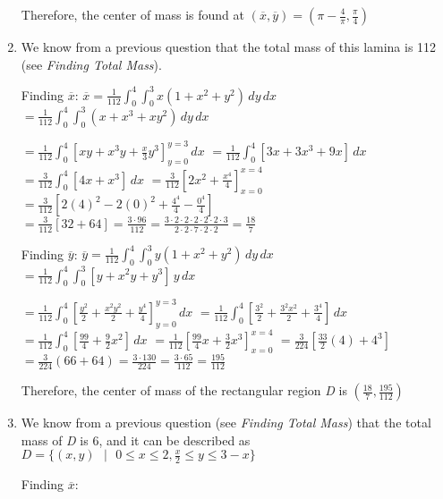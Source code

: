 \begin{Answer}[ref = c_of_m]
\begin{enumerate}
Therefore, the center of mass is found at $\left( \overline{x}, \overline{y}
\right) = \left( \pi - \frac{4}{\pi}, \frac{\pi}{4} \right)$

\item We know from a previous question that the total mass of this lamina is 
112 (see \textit{Finding Total Mass}). 

Finding $\overline{x}$: $\overline{x} = \frac{1}{112} \int_0^4 \int_0^3 x 
\left( 1 + x^2 + y^2 \right)\,dy\,dx$ 
$= \frac{1}{112} \int_0^4 \int_0^3 \left(x + x^3 + xy^2 \right)\,dy\,dx$ 

$= \frac{1}{112} \int_0^4 \left[ xy + x^3y + \frac{x}{3}y^3 \right]_{y = 0}^{y 
= 3} \,dx$ 
$= \frac{1}{112} \int_0^4 \left[3x + 3x^3 + 9x \right]\,dx$ 
$= \frac{3}{112} \int_0^4 \left[ 4x + x^3 \right]\,dx$ 
$= \frac{3}{112} \left[ 2x^2 + \frac{x^4}{4} \right]_{x = 0}^{x = 4}$ 
$= \frac{3}{112} \left[ 2(4)^2 - 2(0)^2 + \frac{4^4}{4} - \frac{0^4}{4} 
\right]$ 
$= \frac{3}{112} \left[ 32 + 64 \right] = \frac{3 \cdot 96}{112} = \frac{3 
\cdot 2 \cdot 2 \cdot 2 \cdot 2 \cdot 2 \cdot 3}{2 \cdot 2 \cdot 7 \cdot 2 
\cdot 2} = \frac{18}{7}$

Finding $\overline{y}$: $\overline{y} = \frac{1}{112} \int_0^4 \int_0^3 y 
\left( 1 + x^2 + y^2 \right)\,dy\,dx$ 
$= \frac{1}{112} \int_0^4 \int_0^3 \left[ y + x^2y + y^3 \right]\,y\,dx$ 

$= \frac{1}{112} \int_0^4 \left[ \frac{y^2}{2} + \frac{x^2y^2}{2} + \frac{y^4}{
4} \right]_{y = 0}^{y = 3} \,dx$ 
$= \frac{1}{112} \int_0^4 \left[ \frac{3^2}{2} + \frac{3^2x^2}{2} + \frac{3^4}{
4} \right]\,dx$ 
$= \frac{1}{112} \int_0^4 \left[ \frac{99}{4} + \frac{9}{2}x^2 \right] \,dx$ 
$= \frac{1}{112} \left[ \frac{99}{4}x + \frac{3}{2}x^3 \right]_{x = 0}^{x = 4}$ 
$= \frac{3}{224} \left[\frac{33}{2}(4) + 4^3 \right]$ 
$= \frac{3}{224} \left( 66 + 64 \right) = \frac{3 \cdot 130}{224} = \frac{3 
\cdot 65}{112} = \frac{195}{112}$

Therefore, the center of mass of the rectangular region \textit{D} is $\left(
\frac{18}{7}, \frac{195}{112} \right)$

\item We know from a previous question (see \textit{Finding Total Mass}) that 
the total mass of \textit{D} is 6, and it can be described as $\textit{D} = \{ (
x, y) \text{ }|\text{ } 0 \leq x \leq 2, \frac{x}{2} \leq y \leq 3 - x\}$

Finding $\overline{x}$:


\end{enumerate}
\end{Answer}
